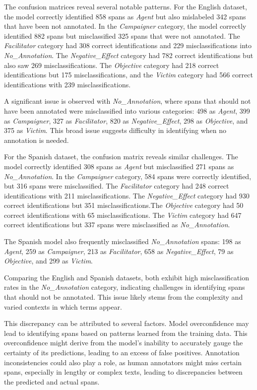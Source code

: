 \documentclass{Configuration_Files/PoliMi3i_thesis}
\begin{document}
The confusion matrices reveal several notable patterns. For the English dataset, the model correctly identified 858 spans as \textit{Agent} but also mislabeled 342 spans that have been not annotated. In the \textit{Campaigner} category, the model correctly identified 882 spans but misclassified 325 spans that were not annotated. The \textit{Facilitator} category had 308 correct identifications and 229 misclassifications into \textit{No\_Annotation}. The \textit{Negative\_Effect} category had 782 correct identifications but also saw 269 misclassifications. The \textit{Objective} category had 218 correct identifications but 175 misclassifications, and the \textit{Victim} category had 566 correct identifications with 239 misclassifications.

A significant issue is observed with \textit{No\_Annotation}, where spans that should not have been annotated were misclassified into various categories: 498 as \textit{Agent}, 399 as \textit{Campaigner}, 327 as \textit{Facilitator}, 820 as \textit{Negative\_Effect}, 298 as \textit{Objective}, and 375 as \textit{Victim}. This broad issue suggests difficulty in identifying when no annotation is needed.

For the Spanish dataset, the confusion matrix reveals similar challenges. The model correctly identified 308 spans as \textit{Agent} but misclassified 271 spans as \textit{No\_Annotation}. In the \textit{Campaigner} category, 584 spans were correctly identified, but 316 spans were misclassified. The \textit{Facilitator} category had 248 correct identifications with 211 misclassifications. The \textit{Negative\_Effect} category had 930 correct identifications but 351 misclassifications.The \textit{Objective} category had 50 correct identifications with 65 misclassifications. The \textit{Victim} category had 647 correct identifications but 337 spans were misclassified as \textit{No\_Annotation}.

The Spanish model also frequently misclassified \textit{No\_Annotation} spans: 198 as \textit{Agent}, 259 as \textit{Campaigner}, 213 as \textit{Facilitator}, 658 as \textit{Negative\_Effect}, 79 as \textit{Objective}, and 299 as \textit{Victim}.

Comparing the English and Spanish datasets, both exhibit high misclassification rates in the \textit{No\_Annotation} category, indicating challenges in identifying spans that should not be annotated. This issue likely stems from the complexity and varied contexts in which terms appear.

This discrepancy can be attributed to several factors. Model overconfidence may lead to identifying spans based on patterns learned from the training data. This overconfidence might derive from the model's inability to accurately gauge the certainty of its predictions, leading to an excess of false positives. Annotation inconsistencies could also play a role, as human annotators might miss certain spans, especially in lengthy or complex texts, leading to discrepancies between the predicted and actual spans.
\end{document}
